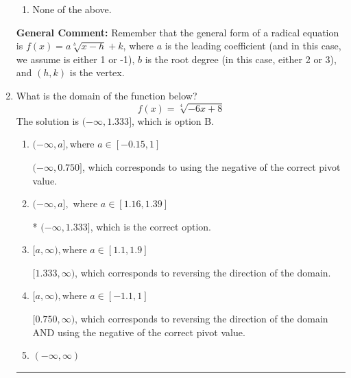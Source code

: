 \documentclass{extbook}[14pt]
\newcommand{\litem}[1]{\item #1

\rule{\textwidth}{0.4pt}}
\begin{document}
\begin{enumerate}
{\begin{enumerate}[label=\Alph*.]
\item None of the above.\end{enumerate}
\textbf{General Comment:} Remember that the general form of a radical equation is $ f(x) = a \sqrt[b]{x - h} + k $, where $a$ is the leading coefficient (and in this case, we assume is either 1 or -1), $b$ is the root degree (in this case, either 2 or 3), and $(h, k)$ is the vertex.
}
\litem{
What is the domain of the function below?
\[ f(x) = \sqrt[4]{-6 x + 8} \]The solution is \( (-\infty, 1.333] \), which is option B.\begin{enumerate}[label=\Alph*.]
\item \( (-\infty, a], \text{where } a \in [-0.15, 1] \)

$(-\infty, 0.750]$, which corresponds to using the negative of the correct pivot value.
\item \( (-\infty, a], \text{ where } a \in [1.16, 1.39] \)

* $(-\infty, 1.333]$, which is the correct option.
\item \( [a, \infty), \text{where } a \in [1.1, 1.9] \)

 $[1.333, \infty)$, which corresponds to reversing the direction of the domain.
\item \( [a, \infty), \text{where } a \in [-1.1, 1] \)

$[0.750, \infty)$, which corresponds to reversing the direction of the domain AND using the negative of the correct pivot value.
\item \( (-\infty, \infty) \)


\end{enumerate}}
\end{enumerate}
\end{document}
